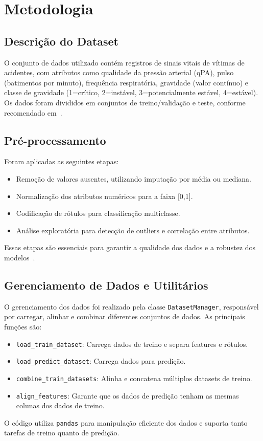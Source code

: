 \documentclass[11pt]{article}
\begin{document}
\section{Metodologia}
\subsection{Descrição do Dataset}
O conjunto de dados utilizado contém registros de sinais vitais de vítimas de acidentes, com atributos como qualidade da pressão arterial (qPA), pulso (batimentos por minuto), frequência respiratória, gravidade (valor contínuo) e classe de gravidade (1=crítico, 2=instável, 3=potencialmente estável, 4=estável). Os dados foram divididos em conjuntos de treino/validação e teste, conforme recomendado em~\cite{pedregosa2011scikit}.

\subsection{Pré-processamento}
Foram aplicadas as seguintes etapas:
\begin{itemize}
    \item Remoção de valores ausentes, utilizando imputação por média ou mediana.
    \item Normalização dos atributos numéricos para a faixa [0,1].
    \item Codificação de rótulos para classificação multiclasse.
    \item Análise exploratória para detecção de outliers e correlação entre atributos.
\end{itemize}
Essas etapas são essenciais para garantir a qualidade dos dados e a robustez dos modelos~\cite{shickel2017deep}.

\subsection{Gerenciamento de Dados e Utilitários}
O gerenciamento dos dados foi realizado pela classe \texttt{DatasetManager}, responsável por carregar, alinhar e combinar diferentes conjuntos de dados. As principais funções são:
\begin{itemize}
    \item \texttt{load\_train\_dataset}: Carrega dados de treino e separa features e rótulos.
    \item \texttt{load\_predict\_dataset}: Carrega dados para predição.
    \item \texttt{combine\_train\_datasets}: Alinha e concatena múltiplos datasets de treino.
    \item \texttt{align\_features}: Garante que os dados de predição tenham as mesmas colunas dos dados de treino.
\end{itemize}
O código utiliza \texttt{pandas} para manipulação eficiente dos dados e suporta tanto tarefas de treino quanto de predição.
\end{document}

